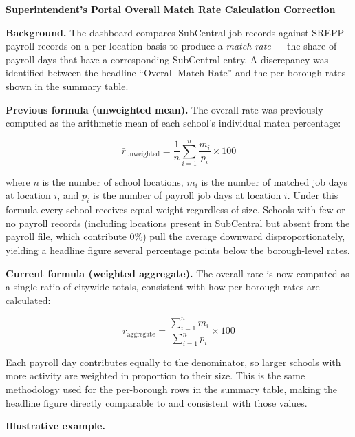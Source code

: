 \documentclass[11pt, letterpaper]{article}
\begin{document}
\begin{center}
  {\large\bfseries\color{nycblue} Superintendent's Portal Overall Match Rate Calculation Correction}\\[0.4em]
\end{center}

\bigskip

\textbf{Background.} The dashboard compares SubCentral job records against
SREPP payroll records on a per-location basis to produce a \emph{match rate}
--- the share of payroll days that have a corresponding SubCentral entry.
A discrepancy was identified between the headline ``Overall Match Rate'' and
the per-borough rates shown in the summary table.

\bigskip

\textbf{Previous formula (unweighted mean).}
The overall rate was previously computed as the arithmetic mean of each
school's individual match percentage:

\[
  \bar{r}_{\text{unweighted}}
  = \frac{1}{n} \sum_{i=1}^{n} \frac{m_i}{p_i} \times 100
\]

where $n$ is the number of school locations, $m_i$ is the number of matched
job days at location $i$, and $p_i$ is the number of payroll job days at
location $i$. Under this formula every school receives equal weight regardless
of size. Schools with few or no payroll records (including locations present
in SubCentral but absent from the payroll file, which contribute $0\%$) pull
the average downward disproportionately, yielding a headline figure several
percentage points below the borough-level rates.

\bigskip

\textbf{Current formula (weighted aggregate).}
The overall rate is now computed as a single ratio of citywide totals,
consistent with how per-borough rates are calculated:

\[
  r_{\text{aggregate}}
  = \frac{\displaystyle\sum_{i=1}^{n} m_i}{\displaystyle\sum_{i=1}^{n} p_i}
    \times 100
\]

Each payroll day contributes equally to the denominator, so larger schools
with more activity are weighted in proportion to their size. This is the same
methodology used for the per-borough rows in the summary table, making the
headline figure directly comparable to and consistent with those values.

\bigskip

\textbf{Illustrative example.}
\end{document}
